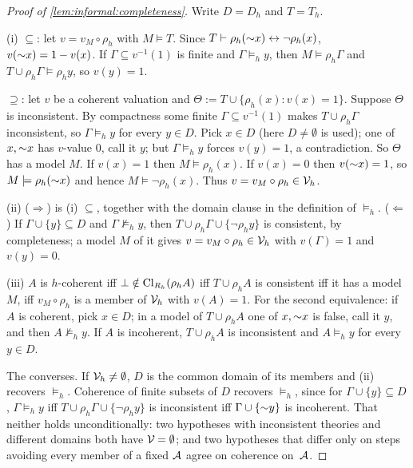\begin{proof}[Proof of \cref{lem:informal:completeness}]
Write $D=D_h$ and $T=T_h$.

(i) $\subseteq$: let $v=v_M\circ\rho_h$ with $M\models T$. Since $T\vdash\rho_h({\sim} x)\leftrightarrow\neg\rho_h(x)$, $v({\sim} x)=1-v(x)$. If $\Gamma\subseteq v^{-1}(1)$ is finite and $\Gamma\models_hy$, then $M\models\rho_h\Gamma$ and $T\cup\rho_h\Gamma\models\rho_hy$, so $v(y)=1$.

$\supseteq$: let $v$ be a coherent valuation and $\Theta:=T\cup\{\rho_h(x):v(x)=1\}$. Suppose $\Theta$ is inconsistent. By compactness some finite $\Gamma\subseteq v^{-1}(1)$ makes $T\cup\rho_h\Gamma$ inconsistent, so $\Gamma\models_hy$ for every $y\in D$. Pick $x\in D$ (here $D\ne\emptyset$ is used); one of $x,{\sim} x$ has $v$-value $0$, call it $y$; but $\Gamma\models_hy$ forces $v(y)=1$, a contradiction. So $\Theta$ has a model $M$. If $v(x)=1$ then $M\models\rho_h(x)$. If $v(x)=0$ then $v({\sim} x)=1$, so $M\models\rho_h({\sim} x)$ and hence $M\models\neg\rho_h(x)$. Thus $v=v_M\circ\rho_h\in\mathcal V_{h}$.

(ii) ($\Rightarrow$) is (i) $\subseteq$, together with the domain clause in the definition of ${\models_h}$. ($\Leftarrow$) If $\Gamma\cup\{y\}\subseteq D$ and $\Gamma\not\models_hy$, then $T\cup\rho_h\Gamma\cup\{\neg\rho_hy\}$ is consistent, by completeness; a model $M$ of it gives $v=v_M\circ\rho_h\in\mathcal V_{h}$ with $v(\Gamma)=1$ and $v(y)=0$.

(iii) $A$ is $h$-coherent iff $\bot\notin\mathrm{Cl}_{R_h}(\rho_hA)$ iff $T\cup\rho_hA$ is consistent iff it has a model $M$, iff $v_M\circ\rho_h$ is a member of $\mathcal V_{h}$ with $v(A)=1$. For the second equivalence: if $A$ is coherent, pick $x\in D$; in a model of $T\cup\rho_hA$ one of $x,{\sim} x$ is false, call it $y$, and then $A\not\models_hy$. If $A$ is incoherent, $T\cup\rho_hA$ is inconsistent and $A\models_hy$ for every $y\in D$.

The converses. If $\mathcal V_{h}\ne\emptyset$, $D$ is the common domain of its members and (ii) recovers ${\models_h}$. Coherence of finite subsets of $D$ recovers ${\models_h}$, since for $\Gamma\cup\{y\}\subseteq D$, $\Gamma\models_hy$ iff $T\cup\rho_h\Gamma\cup\{\neg\rho_hy\}$ is inconsistent iff $\Gamma\cup\{{\sim} y\}$ is incoherent. That neither holds unconditionally: two hypotheses with inconsistent theories and different domains both have $\mathcal V_{}=\emptyset$; and two hypotheses that differ only on steps avoiding every member of a fixed $\mathcal{A}$ agree on coherence on~$\mathcal{A}$.
\end{proof}

